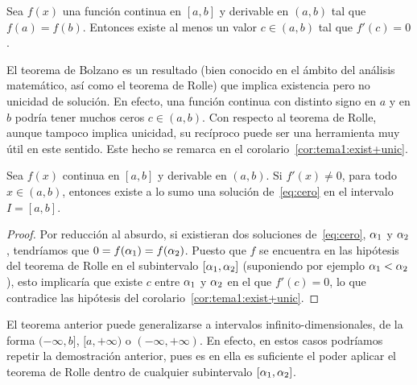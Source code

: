 \begin{theorem}[Rolle]
  \label{thm:bolzano}
  Sea $f(x)$ una función continua en $[a, b]$ y derivable en
  $(a, b)$ tal que $f(a) = f(b)$.
  Entonces existe al menos un valor $c \in (a, b)$ tal que $f'(c) = 0$.
\end{theorem}

El teorema de Bolzano es un resultado (bien conocido en el ámbito del
análisis matemático, así como el teorema de Rolle) que implica
existencia pero no unicidad de solución. En efecto, una función
continua con distinto signo en $a$ y en $b$ podría tener muchos ceros
$c\in (a,b)$. Con respecto al teorema de Rolle, aunque tampoco implica
unicidad, su recíproco puede ser una herramienta muy útil en este
sentido. Este hecho se remarca en el
corolario~\ref{cor:tema1:exist+unic}.



\begin{corollary}
  \label{cor:tema1:exist+unic}
  Sea $f(x)$ continua en $[a, b]$ y derivable en $(a, b)$. Si
  $f'(x)\ne 0$, para todo $x\in (a, b)$, entonces existe a lo sumo una
  solución de~\eqref{eq:cero} en el intervalo $I=[a,b]$.
\end{corollary}

\begin{proof}
  Por reducción al absurdo, si existieran dos soluciones
  de~\eqref{eq:cero}, $\alpha_1$ y $\alpha_2$, tendríamos que
  $0=f(\alpha_1)=f(\alpha_2)$.  Puesto que $f$ se encuentra en las
  hipótesis del teorema de Rolle en el subintervalo
  $[\alpha_1,\alpha_2]$ (suponiendo por ejemplo $\alpha_1<\alpha_2$), esto
  implicaría que existe $c$ entre $\alpha_1$ y $\alpha_2$ en el que
  $f'(c)=0$, lo que contradice las hipótesis del
  corolario~\ref{cor:tema1:exist+unic}.
\end{proof}

\begin{remark}
  \label{rk:tema1:exist+unic}
  El teorema anterior puede generalizarse a intervalos
  infinito-dimensionales, de la forma $(-\infty,b]$, $[a,+\infty)$ o
  $(-\infty,+\infty)$. En efecto, en estos casos podríamos repetir la
  demostración anterior, pues es en ella es suficiente el poder
  aplicar el teorema de Rolle dentro de cualquier subintervalo
  $[\alpha_1,\alpha_2]$.
\end{remark}

